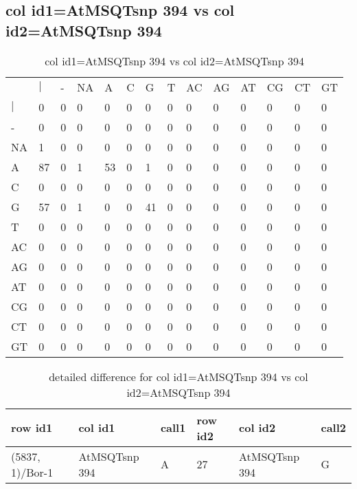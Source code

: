 \subsection{col id1=AtMSQTsnp 394 vs col id2=AtMSQTsnp 394}
\begin{center}
\begin{longtable}{|l|l|l|l|l|l|l|l|l|l|l|l|l|l|}
\caption{col id1=AtMSQTsnp 394 vs col id2=AtMSQTsnp 394} \label{table_dm704}\\
\hline
\\
\hline
&$|$&-&NA&A&C&G&T&AC&AG&AT&CG&CT&GT\\
$|$&0&0&0&0&0&0&0&0&0&0&0&0&0\\
-&0&0&0&0&0&0&0&0&0&0&0&0&0\\
NA&1&0&0&0&0&0&0&0&0&0&0&0&0\\
A&87&0&1&53&0&1&0&0&0&0&0&0&0\\
C&0&0&0&0&0&0&0&0&0&0&0&0&0\\
G&57&0&1&0&0&41&0&0&0&0&0&0&0\\
T&0&0&0&0&0&0&0&0&0&0&0&0&0\\
AC&0&0&0&0&0&0&0&0&0&0&0&0&0\\
AG&0&0&0&0&0&0&0&0&0&0&0&0&0\\
AT&0&0&0&0&0&0&0&0&0&0&0&0&0\\
CG&0&0&0&0&0&0&0&0&0&0&0&0&0\\
CT&0&0&0&0&0&0&0&0&0&0&0&0&0\\
GT&0&0&0&0&0&0&0&0&0&0&0&0&0\\
\hline
\end{longtable}
\end{center}

\begin{center}
\begin{longtable}{|l|l|l|l|l|l|}
\caption{detailed difference for col id1=AtMSQTsnp 394 vs col id2=AtMSQTsnp 394} \label{table_dm705}\\
\hline
row id1&col id1&call1&row id2&col id2&call2\\
\hline
(5837, 1)/Bor-1&AtMSQTsnp 394&A&27&AtMSQTsnp 394&G\\
\hline
\end{longtable}
\end{center}

